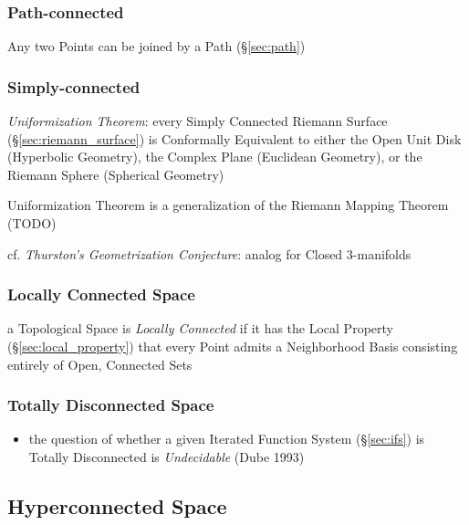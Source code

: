 \subsubsection{Path-connected}\label{sec:path_connected}

Any two Points can be joined by a Path (\S\ref{sec:path})



\subsubsection{Simply-connected}\label{sec:simply_connected}

\emph{Uniformization Theorem}: every Simply Connected Riemann Surface
(\S\ref{sec:riemann_surface}) is Conformally Equivalent to either the Open Unit
Disk (Hyperbolic Geometry), the Complex Plane (Euclidean Geometry), or the
Riemann Sphere (Spherical Geometry)

Uniformization Theorem is a generalization of the Riemann Mapping Theorem (TODO)

\fist cf. \emph{Thurston's Geometrization Conjecture}: analog for Closed
3-manifolds



\subsubsection{Locally Connected Space}\label{sec:locally_connected}

a Topological Space is \emph{Locally Connected} if it has the Local Property
(\S\ref{sec:local_property}) that every Point admits a Neighborhood Basis
consisting entirely of Open, Connected Sets



\subsubsection{Totally Disconnected Space}\label{sec:totally_disconnected}

\begin{itemize}
  \item the question of whether a given Iterated Function System
    (\S\ref{sec:ifs}) is Totally Disconnected is \emph{Undecidable} (Dube 1993)
\end{itemize}



\subsection{Hyperconnected Space}\label{sec:hyperconnected_space}

